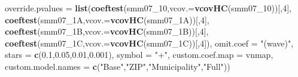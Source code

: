 \documentclass[
]{article}
\newenvironment{Shaded}{\begin{snugshade}}{\end{snugshade}}
\newcommand{\DataTypeTok}[1]{\textcolor[rgb]{0.13,0.29,0.53}{#1}}
\newcommand{\DecValTok}[1]{\textcolor[rgb]{0.00,0.00,0.81}{#1}}
\newcommand{\FloatTok}[1]{\textcolor[rgb]{0.00,0.00,0.81}{#1}}
\newcommand{\KeywordTok}[1]{\textcolor[rgb]{0.13,0.29,0.53}{\textbf{#1}}}
\newcommand{\NormalTok}[1]{#1}
\newcommand{\StringTok}[1]{\textcolor[rgb]{0.31,0.60,0.02}{#1}}
\begin{document}
\begin{Shaded}
\begin{Highlighting}[]
          \DataTypeTok{override.pvalues =} \KeywordTok{list}\NormalTok{(}\KeywordTok{coeftest}\NormalTok{(smm07_}\DecValTok{10}\NormalTok{,}\DataTypeTok{vcov.=}\KeywordTok{vcovHC}\NormalTok{(smm07_}\DecValTok{10}\NormalTok{))[,}\DecValTok{4}\NormalTok{],}
                                  \KeywordTok{coeftest}\NormalTok{(smm07_1A,}\DataTypeTok{vcov.=}\KeywordTok{vcovHC}\NormalTok{(smm07_1A))[,}\DecValTok{4}\NormalTok{],}
                                  \KeywordTok{coeftest}\NormalTok{(smm07_1B,}\DataTypeTok{vcov.=}\KeywordTok{vcovHC}\NormalTok{(smm07_1B))[,}\DecValTok{4}\NormalTok{],}
                                  \KeywordTok{coeftest}\NormalTok{(smm07_1C,}\DataTypeTok{vcov.=}\KeywordTok{vcovHC}\NormalTok{(smm07_1C))[,}\DecValTok{4}\NormalTok{]),}
          \DataTypeTok{omit.coef =} \StringTok{"(wave)"}\NormalTok{, }\DataTypeTok{stars =} \KeywordTok{c}\NormalTok{(}\FloatTok{0.1}\NormalTok{,}\FloatTok{0.05}\NormalTok{,}\FloatTok{0.01}\NormalTok{,}\FloatTok{0.001}\NormalTok{), }\DataTypeTok{symbol =} \StringTok{"+"}\NormalTok{,}
          \DataTypeTok{custom.coef.map =}\NormalTok{ vnmap, }
          \DataTypeTok{custom.model.names =} \KeywordTok{c}\NormalTok{(}\StringTok{"Base"}\NormalTok{,}\StringTok{"ZIP"}\NormalTok{,}\StringTok{"Municipality"}\NormalTok{,}\StringTok{"Full"}\NormalTok{))}
\end{Highlighting}
\end{Shaded}
\end{document}
